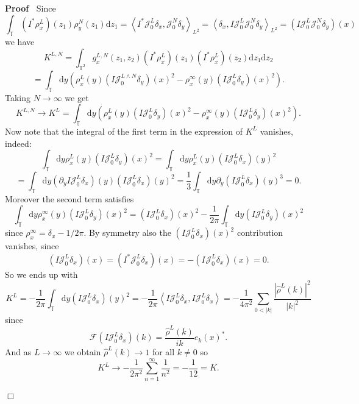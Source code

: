 \documentclass[a4paper,11pt]{article}
\newcommand{\mathd}{\mathrm{d}}
\newenvironment{proof}{\noindent\textbf{Proof\ }}{\hspace*{\fill}$\Box$\medskip}
\newcommand{\FF}{\mathscr{F}}
\newcommand{\JJ}{\mathcal{J}}
\begin{document}
\begin{proof}
  Since
  \[ \int_{\mathbb{T}} (I^{\ast} \rho_x^L) (z_1) \rho^N_y (z_1) \mathd z_1 =
     \left\langle I^{\ast} \JJ^L_0 \delta_x, \JJ^N_0 \delta_y
     \right\rangle_{L^2} = \left\langle \delta_x, I \JJ^L_0  \JJ^N_0 \delta_y
     \right\rangle_{L^2} = \left( I \JJ^L_0  \JJ^N_0 \delta_y \right) (x) \]
  we have
  \[ K^{L, N} = \int_{\mathbb{T}^2} g_x^{L, N} (z_1, z_2) (I^{\ast} \rho_x^L)
     (z_1) (I^{\ast} \rho_x^L) (z_2) \mathd z_1 \mathd z_2 \]
  \[ = \int_{\mathbb{T}} \mathd y (\rho_x^L (y) \left( I \JJ^{L \wedge N}_0
     \delta_y \right) (x)^2 - \rho_x^{\infty} (y) \left( I \JJ^L_0 \delta_y
     \right) (x)^2) . \]
  Taking $N \rightarrow \infty$ we get
  \[ K^{L, N} \rightarrow K^L = \int_{\mathbb{T}} \mathd y (\rho_x^L (y)
     \left( I \JJ^L_0 \delta_y \right) (x)^2 - \rho_x^{\infty} (y) \left( I
     \JJ^L_0 \delta_y \right) (x)^2) . \]
  Now note that the integral of the first term in the expression of $K^L$
  vanishes, indeed:
  \[ \int_{\mathbb{T}} \mathd y \rho_x^L (y) \left( I \JJ^L_0 \delta_y
     \right) (x)^2 = \int_{\mathbb{T}} \mathd y \rho_x^L (y) \left( I \JJ^L_0
     \delta_x \right) (y)^2 \]
  \[ = \int_{\mathbb{T}} \mathd y \left( \partial_y I \JJ_0^L \delta_x
     \right) (y) \left( I \JJ^L_0 \delta_x \right) (y)^2 = \frac{1}{3}
     \int_{\mathbb{T}} \mathd y \partial_y \left( I \JJ^L_0 \delta_x \right)
     (y)^3 = 0. \]
  Moreover the second term satisfies
  \[ \int_{\mathbb{T}} \mathd y \rho_x^{\infty} (y) \left( I \JJ^L_0 \delta_y
     \right) (x)^2 = \left( I \JJ^L_0 \delta_x \right) (x)^2 - \frac{1}{2 \pi}
     \int_{\mathbb{T}} \mathd y \left( I \JJ^L_0 \delta_y \right) (x)^2 \]
  since $\rho_x^{\infty} = \delta_x - 1 / 2 \pi$. By symmetry also the $\left(
  I \JJ^L_0 \delta_x \right) (x)^2$ contribution vanishes, since
  \[ \left( I \JJ^L_0 \delta_x \right) (x) = \left( I^{\ast} \JJ^L_0 \delta_x
     \right) (x) = - \left( I^{} \JJ^L_0 \delta_x \right) (x) = 0. \]
  So we ends up with
  \[ K^L = - \frac{1}{2 \pi} \int_{\mathbb{T}} \mathd y \left( I \JJ^L_0
     \delta_x \right) (y)^2 = - \frac{1}{2 \pi} \left\langle I \JJ^L_0
     \delta_x, I \JJ^L_0 \delta_x \right\rangle = - \frac{1}{4 \pi^2} \sum_{0
     < | k |} \frac{| \hat{\rho}^L (k) |^2}{| k |^2} \]
  since
  \[ \FF \left( I \JJ^L_0 \delta_x \right) (k) = \frac{\hat{\rho}^L (k)}{ik}
     e_k (x)^{\ast} . \]
  And as $L \rightarrow \infty$ we obtain $\hat{\rho}^L (k) \rightarrow 1$ for
  all $k \neq 0$ so
  \[ K^L \rightarrow - \frac{1}{2 \pi^2} \sum_{n = 1}^{\infty} \frac{1}{n^2} =
     - \frac{1}{12} = K. \]
  
\end{proof}
\end{document}
